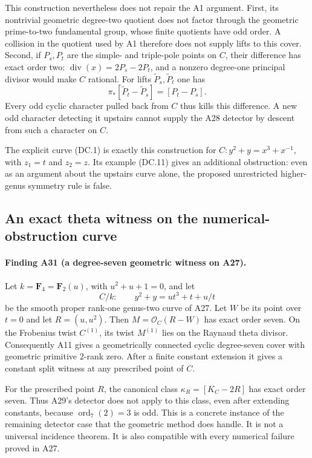 \documentclass[11pt,a4paper]{article}
\begin{document}
This construction nevertheless does not repair the A1
argument.  First, its nontrivial geometric degree-two
quotient does not factor through the geometric
prime-to-two fundamental group, whose finite quotients
have odd order.  A collision in the quotient used by A1
therefore does not supply lifts to this cover.
Second, if $P_s,P_t$ are the simple- and triple-pole
points on $C$, their difference has exact order two:
$\operatorname{div}(x)=2P_s-2P_t$, and a nonzero
degree-one principal divisor would make $C$ rational.
For lifts $\widetilde P_s,\widetilde P_t$ one has
\[
 \pi_*[\widetilde P_t-\widetilde P_s]=[P_t-P_s].
\tag{DC.13}
\]
Every odd cyclic character pulled back from $C$ thus
kills this difference.  A new odd character detecting
it upstairs cannot supply the A28 detector by descent
from such a character on $C$.

The explicit curve (DC.1) is exactly this construction
for $C:y^2+y=x^3+x^{-1}$, with $z_1=t$ and $z_2=z$.
Its example (DC.11) gives an additional obstruction:
even as an argument about the upstairs curve alone,
the proposed unrestricted higher-genus symmetry rule
is false.


\subsection{An exact theta witness on the numerical-obstruction curve}
\label{sec:a27-theta-seven}

\paragraph{Finding A31 (a degree-seven geometric witness on A27).}
Let $k=\mathbf F_4=\mathbf F_2(u)$, with $u^2+u+1=0$, and let
\[
 C/k:\qquad y^2+y=u t^3+t+u/t
 \tag{TS.1}
\]
be the smooth proper rank-one genus-two curve of A27.  Let $W$ be
its point over $t=0$ and let $R=(u,u^2)$.  Then
$M=\mathcal O_C(R-W)$ has exact order seven.  On the Frobenius
twist $C^{(1)}$, its twist $M^{(1)}$ lies on the Raynaud theta
divisor.  Consequently A11 gives a geometrically connected cyclic
degree-seven cover with geometric primitive $2$-rank zero.  After
a finite constant extension it gives a constant split witness at
any prescribed point of $C$.

For the prescribed point $R$, the canonical class
$\kappa_R=[K_C-2R]$ has exact order seven.  Thus A29's detector
does not apply to this class, even after extending constants,
because $\operatorname{ord}_7(2)=3$ is odd.  This is a concrete
instance of the remaining detector case that the geometric method
does handle.  It is not a universal incidence theorem.  It is also
compatible with every numerical failure proved in A27.
\end{document}
